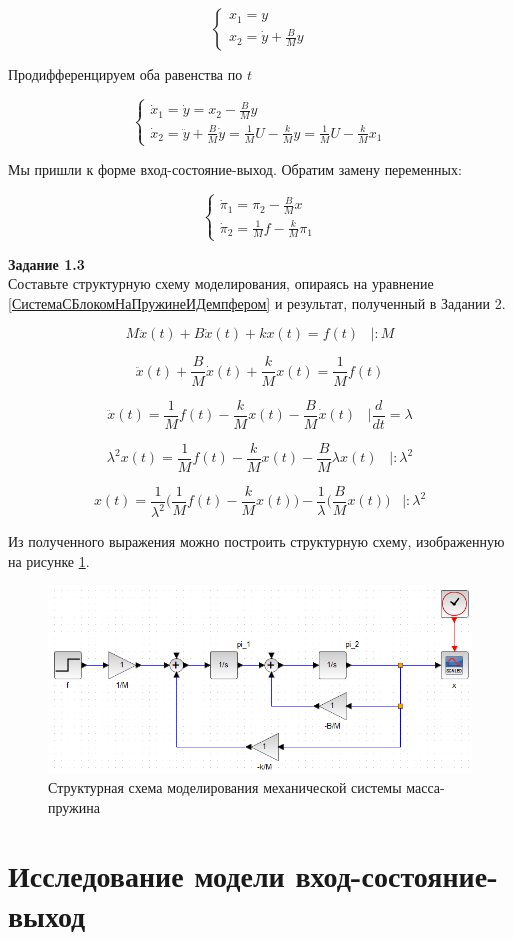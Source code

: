 \documentclass[a4paper, 12pt]{article}
\begin{document}
$$ \begin{cases}
x_1 = y \\
x_2 = \dot{y} + \frac{B}{M} y
\end{cases} $$

Продифференцируем оба равенства по $t$

$$ \begin{cases}
\dot x_1 = \dot y = x_2 - \frac{B}{M} y \\
\dot x_2 = \ddot y +\frac{B}{M} \dot y = \frac{1}{M} U - \frac{k}{M} y = \frac{1}{M} U - \frac{k}{M} x_1
\end{cases} $$

Мы пришли к форме вход-состояние-выход. Обратим замену переменных:

$$ \begin{cases}
\dot \pi_1 = \pi_2 - \frac{B}{M} x \\
\dot \pi_2 = \frac{1}{M} f - \frac{k}{M} \pi_1
\end{cases} $$

\textbf{Задание 1.3 } \\
Составьте структурную схему моделирования, опираясь на уравнение \ref{СистемаСБлокомНаПружинеИДемпфером} и результат, полученный в Задании 2.

$$M\ddot{x}(t) + B\dot{x}(t) + kx(t) = f(t) \; \; \; |:M $$

$$\ddot{x}(t) + \frac{B}{M}\dot{x}(t) + \frac{k}{M}x(t) = \frac{1}{M} f(t) $$

$$ \ddot{x}(t) = \frac{1}{M} f(t) - \frac{k}{M}x(t) - \frac{B}{M}\dot{x}(t) \; \; \; |\frac{d}{dt} = \lambda$$

$$ \lambda^2 x(t) = \frac{1}{M} f(t) - \frac{k}{M}x(t) - \frac{B}{M} \lambda x(t) \; \; \; |:\lambda^2$$

$$ x(t) = \frac{1}{\lambda^2} \Big( \frac{1}{M} f(t) - \frac{k}{M}x(t) \Big) -\frac{1}{\lambda} \Big( \frac{B}{M} x(t) \Big) \; \; \; |:\lambda^2$$


Из полученного выражения можно построить структурную схему, изображенную на рисунке \ref{p:Схема1}.

\begin{figure}[h!]
	\centering
	\includegraphics[scale=0.6]{scheme1}
	\caption{Структурная схема моделирования механической системы масса-пружина }
	\label{p:Схема1}
\end{figure}

\newpage
\section{Исследование модели вход-состояние-выход}
\end{document}
